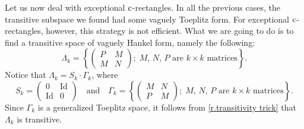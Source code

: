 \documentclass[10pt, a4paper]{amsart}
\theoremstyle{plain}
\theoremstyle{definition}
\theoremstyle{remark}
\theoremstyle{note}
\numberwithin{equation}{section}
\begin{document}
Let us now deal with exceptional $\rm c$-rectangles.
In all the previous cases, the transitive subspace we found had some vaguely Toeplitz form.
For exceptional $\rm c$-rectangles, however, this strategy is not efficient. 
What we are going to do is to find a transitive space of vaguely Hankel form, namely the following:
\begin{equation}\label{e.hankel like}
\Lambda_k = \left\{ 
\begin{pmatrix}
P & M \\
M & N
\end{pmatrix};
\; \text{$M$, $N$, $P$ are $k\times k$ matrices}
\right\}.
\end{equation}
Notice that $\Lambda_k = S_k \cdot \Gamma_k$, where
$$
S_k = \begin{pmatrix} 0 & {\mathrm{Id}} \\ {\mathrm{Id}} & 0 \end{pmatrix}
\quad \text{and} \quad
\Gamma_k = \left\{ 
\begin{pmatrix}
M & N \\
P & M
\end{pmatrix};
\; \text{$M$, $N$, $P$ are $k\times k$ matrices}
\right\}.
$$
Since $\Gamma_k$ is 
a generalized Toeplitz space, 
it follows from \cref{r.transitivity trick} that $\Lambda_k$ is transitive.
\end{document}
